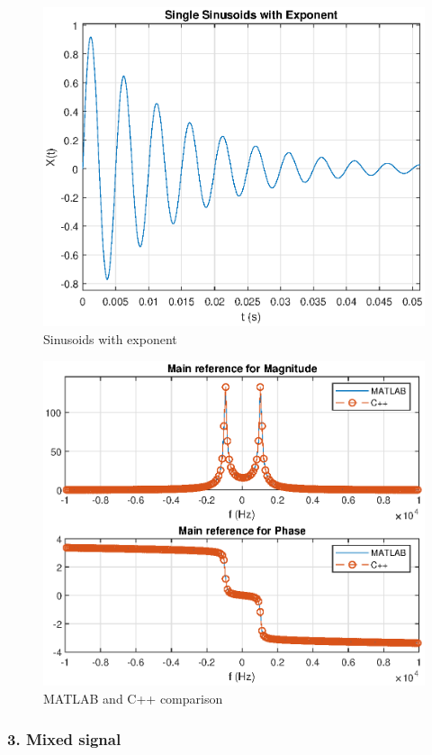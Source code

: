 \begin{refsection}
\begin{figure}[h]
	\centering
	\includegraphics[width=12cm]{./algorithms/fft/figures/Single_sinusoid.eps}
	\caption{Sinusoids with exponent}\label{Single_sinusoid}
\end{figure}

\begin{figure}[h]
	\centering
	\includegraphics[width=12cm]{./algorithms/fft/figures/Single_sinusoid_fft.eps}
	\caption{MATLAB and C++ comparison}\label{Single_sinusoid_fft}
\end{figure}

\newpage
\subsubsection{3. Mixed signal}


\end{refsection}
